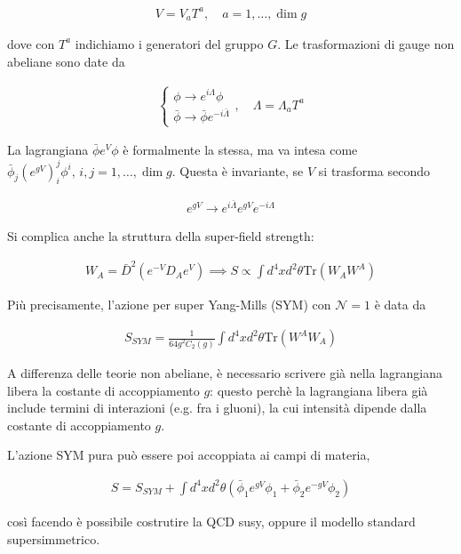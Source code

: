 \documentclass{report}
\begin{document}
\begin{align}
    V = V_a T^a, \quad a = 1, \ldots, \dim g 
\end{align}

dove con \(T^a\) indichiamo i generatori del gruppo \(G\). Le trasformazioni di gauge non abeliane sono date da 

\begin{align}
    \begin{cases}
        \phi \to e^{i\Lambda}\phi \\ \bar{\phi} \to \bar{\phi}e^{-i\bar{\Lambda}}
    \end{cases}, \quad \Lambda = \Lambda_a T^a 
\end{align}

La lagrangiana \(\bar{\phi}e^V \phi\) è formalmente la stessa, ma va intesa come \(\bar{\phi}_j (e^{gV})^j_i \phi^i, \, i, j = 1, \ldots, \dim g\). Questa è invariante, se \(V\) si trasforma secondo 

\begin{align}
    e^{gV} \to e^{i\bar{\Lambda}}e^{gV}e^{-i\Lambda}
\end{align}

Si complica anche la struttura della super-field strength: 

\begin{align}
    W_A =   \bar{D}^2(e^{-V}D_A e^V) \implies S \propto \int d^4x d^2\theta \text{Tr}(W_A W^A)
\end{align}

Più precisamente, l'azione per super Yang-Mills (SYM) con \(\mathcal{N} =1\) è data da 

\begin{align}
    S_{SYM} = \frac{1}{64g^2 C_2(g)}\int d^4x d^2\theta \text{Tr}(W^A W_A)
\end{align}

A differenza delle teorie non abeliane, è necessario scrivere già nella lagrangiana libera la costante di accoppiamento \(g\): questo perchè la lagrangiana libera già include termini di interazioni (e.g. fra i gluoni), la cui intensità dipende dalla costante di accoppiamento \(g\). 

L'azione SYM pura può essere poi accoppiata ai campi di materia, 

\begin{align}
    S = S_{SYM} + \int d^4x d^2\theta (\bar{\phi}_1 e^{gV}\phi_1 + \bar{\phi}_2 e^{-gV}\phi_2)
\end{align}

così facendo è possibile costrutire la QCD susy, oppure il modello standard supersimmetrico. 
\end{document}
